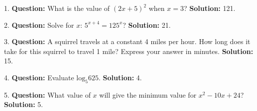 \begin{tcolorbox}[casestudy={Frequently Skipped Prompts (Easy)}]
1. \textbf{Question:} What is the value of $(2x + 5)^2$ when $x = 3$? \textbf{Solution:} 121.
\vspace{0.2cm}

2. \textbf{Question:} Solve for $x$: $5^{x + 4} = 125^x$?  
\textbf{Solution:} 21.
\vspace{0.2cm}

3. \textbf{Question:} A squirrel travels at a constant 4 miles per hour. How long does it take for this squirrel to travel 1 mile? Express your answer in minutes.  
\textbf{Solution:} 15.
\vspace{0.2cm}

4. \textbf{Question:} Evaluate $\text{log}_5 625$.  
\textbf{Solution:} 4.
\vspace{0.2cm}

5. \textbf{Question:} What value of $x$ will give the minimum value for $x^2- 10x + 24$? 
\textbf{Solution:} 5.
\end{tcolorbox}


